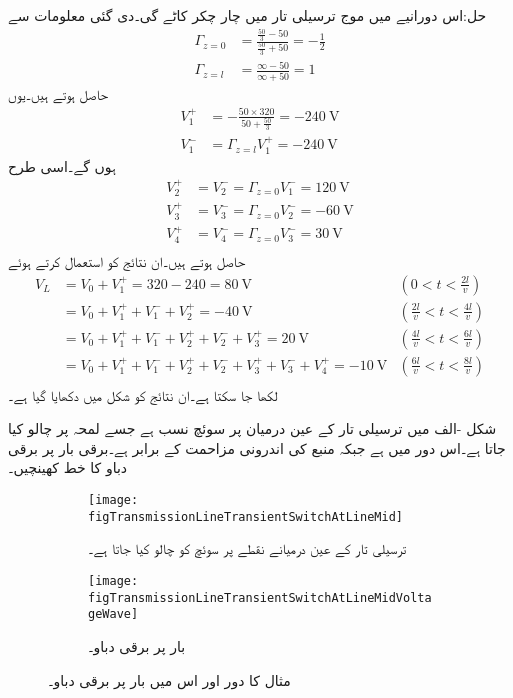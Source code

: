حل:اس دورانیے میں موج ترسیلی تار میں چار چکر کاٹے گی۔دی گئی معلومات سے
\begin{align*}
\Gamma_{z=0}&=\frac{\frac{50}{3}-50}{\frac{50}{3}+50}=-\frac{1}{2}\\
\Gamma_{z=l}&=\frac{\infty - 50}{\infty + 50}=1
\end{align*}
حاصل ہوتے ہیں۔یوں
\begin{align*}
V_1^+&=-\frac{50 \times 320}{50+\frac{50}{3}}=\SI{-240}{\volt}\\
V_1^-&=\Gamma_{z=l} V_1^+=\SI{-240}{\volt}
\end{align*}
ہوں گے۔اسی طرح
\begin{align*}
V_2^+&=V_2^-=\Gamma_{z=0} V_1^-=\SI{120}{\volt}\\
V_3^+&=V_3^-=\Gamma_{z=0} V_2^-=\SI{-60}{\volt}\\
V_4^+&=V_4^-=\Gamma_{z=0} V_3^-=\SI{30}{\volt}\\
\end{align*}
حاصل ہوتے ہیں۔ان نتائج کو استعمال کرتے ہوئے
\begin{align*}
V_L&=V_0+V_1^+=320-240=\SI{80}{\volt} & (0<t<\tfrac{2l}{v})\\
&=V_0+V_1^+ +V_1^-+V_2^+=\SI{-40}{\volt} & (\tfrac{2l}{v}<t<\tfrac{4l}{v})\\
&=V_0+V_1^+ +V_1^-+V_2^+ +V_2^-+V_3^+=\SI{20}{\volt} & (\tfrac{4l}{v}<t<\tfrac{6l}{v})\\
&=V_0+V_1^+ +V_1^-+V_2^+ +V_2^-+V_3^+ +V_3^-+V_4^+=\SI{-10}{\volt} &  (\tfrac{6l}{v}<t<\tfrac{8l}{v})\\
\end{align*}
لکھا جا سکتا ہے۔ان نتائج کو شکل  میں دکھایا گیا ہے۔

شکل -الف میں ترسیلی تار کے عین درمیان   پر سوئچ نسب ہے جسے لمحہ  پر چالو کیا جاتا ہے۔اس دور میں  ہے جبکہ منبع کی اندرونی مزاحمت  کے برابر ہے۔برقی بار پر برقی دباو کا خط کھینچیں۔
\begin{figure}
\centering
\begin{subfigure}{0.8\textwidth}
\centering
\texttt{[image: figTransmissionLineTransientSwitchAtLineMid]}
\caption{ترسیلی تار کے عین درمیانے نقطے پر سوئچ کو چالو کیا جاتا ہے۔}
\end{subfigure}

\begin{subfigure}{0.8\textwidth}
\centering
\texttt{[image: figTransmissionLineTransientSwitchAtLineMidVoltageWave]}
\caption{بار پر برقی دباو۔}
\end{subfigure}
\caption{مثال  کا دور اور اس میں بار پر برقی دباو۔}
\label{شکل_ترسیلی_مثال_سوئچ_درمیان}
\end{figure}

